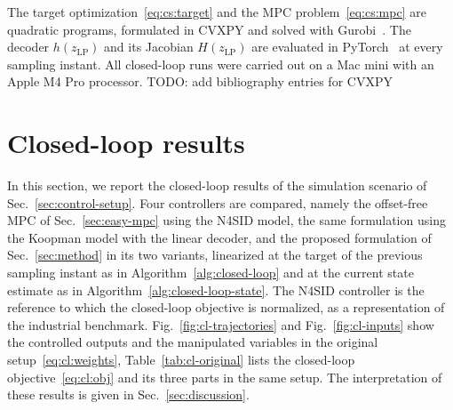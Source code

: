 \documentclass[preprint,12pt,authoryear]{elsarticle}
\theoremstyle{remark}
\newcommand{\ui}[2]{#1_{\text{#2}}}
\newcommand{\todo}[1]{{{\color{red} TODO: #1	}} }
\begin{document}
The target optimization~\eqref{eq:cs:target} and the MPC problem~\eqref{eq:cs:mpc} are quadratic programs, formulated in CVXPY and solved with Gurobi~\cite{gurobi}. The decoder $h(\ui{z}{LP})$ and its Jacobian $H(\ui{z}{LP})$ are evaluated in PyTorch~\cite{paszke2019pytorch} at every sampling instant. 
All closed-loop runs were carried out on a Mac mini with an Apple M4 Pro processor. \todo{add bibliography entries for CVXPY}

\section{Closed-loop results}
\label{sec:Results}

In this section, we report the closed-loop results of the simulation scenario of Sec.~\ref{sec:control-setup}. Four controllers are compared, namely the offset-free MPC of Sec.~\ref{sec:easy-mpc} using the N4SID model, the same formulation using the Koopman model with the linear decoder, and the proposed formulation of Sec.~\ref{sec:method} in its two variants, linearized at the target of the previous sampling instant as in Algorithm~\ref{alg:closed-loop} and at the current state estimate as in Algorithm~\ref{alg:closed-loop-state}. The N4SID controller is the reference to which the closed-loop objective is normalized, as a representation of the industrial benchmark. Fig.~\ref{fig:cl-trajectories} and Fig.~\ref{fig:cl-inputs} show the controlled outputs and the manipulated variables in the original setup~\eqref{eq:cl:weights}, Table~\ref{tab:cl-original} lists the closed-loop objective~\eqref{eq:cl:obj} and its three parts in the same setup. The interpretation of these results is given in Sec.~\ref{sec:discussion}.


\end{document}
